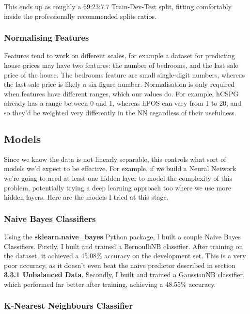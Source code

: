\documentclass[12pt,a4paper,twoside,openright]{report}
\begin{document}
This ends up as roughly a 69:23:7.7 Train-Dev-Test split, fitting comfortably inside the professionally recommended splits ratios.

\subsubsection{Normalising Features}

Features tend to work on different scales, for example a dataset for predicting house prices may have two features: the number of bedrooms, and the last sale price of the house. The bedrooms feature are small single-digit numbers, whereas the last sale price is likely a six-figure number. Normalisation is only required when features have different ranges, which our values do. For example, hCSPG already has a range between 0 and 1, whereas hPOS can vary from 1 to 20, and so they'd be weighted very differently in the NN regardless of their usefulness.

\subsection{Models}

Since we know the data is not linearly separable, this controls what sort of models we'd expect to be effective. For example, if we build a Neural Network we're going to need at least one hidden layer to model the complexity of this problem, potentially trying a deep learning approach too where we use more hidden layers. Here are the models I tried at this stage.

\subsubsection{Naive Bayes Classifiers}

Using the \textbf{sklearn.naive\_bayes} Python package, I built a couple Naive Bayes Classifiers. Firstly, I built and trained a BernoulliNB classifier. After training on the dataset, it achieved a 45.08\% accuracy on the development set. This is a very poor accuracy, as it doesn't even beat the naive predictor described in section \textbf{3.3.1 Unbalanced Data}. Secondly, I built and trained a GaussianNB classifier, which performed far better after training, achieving a 48.55\% accuracy.

\subsubsection{K-Nearest Neighbours Classifier}
\end{document}
